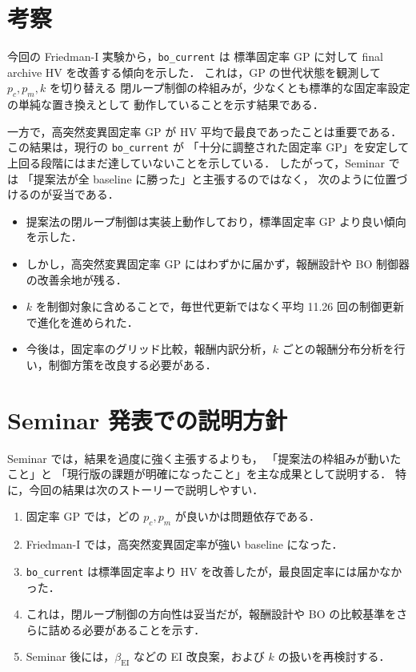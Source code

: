 \documentclass[a4paper,11pt]{ltjsarticle}
\begin{document}
\section{考察}

今回の Friedman-I 実験から，\texttt{bo\_current} は
標準固定率 GP に対して final archive HV を改善する傾向を示した．
これは，GP の世代状態を観測して \(p_c,p_m,k\) を切り替える
閉ループ制御の枠組みが，少なくとも標準的な固定率設定の単純な置き換えとして
動作していることを示す結果である．

一方で，高突然変異固定率 GP が HV 平均で最良であったことは重要である．
この結果は，現行の \texttt{bo\_current} が
「十分に調整された固定率 GP」を安定して上回る段階にはまだ達していないことを示している．
したがって，Seminar では
「提案法が全 baseline に勝った」と主張するのではなく，
次のように位置づけるのが妥当である．

\begin{itemize}
  \item 提案法の閉ループ制御は実装上動作しており，標準固定率 GP より良い傾向を示した．
  \item しかし，高突然変異固定率 GP にはわずかに届かず，報酬設計や BO 制御器の改善余地が残る．
  \item \(k\) を制御対象に含めることで，毎世代更新ではなく平均 11.26 回の制御更新で進化を進められた．
  \item 今後は，固定率のグリッド比較，報酬内訳分析，\(k\) ごとの報酬分布分析を行い，制御方策を改良する必要がある．
\end{itemize}

\section{Seminar 発表での説明方針}

Seminar では，結果を過度に強く主張するよりも，
「提案法の枠組みが動いたこと」と
「現行版の課題が明確になったこと」を主な成果として説明する．
特に，今回の結果は次のストーリーで説明しやすい．

\begin{enumerate}
  \item 固定率 GP では，どの \(p_c,p_m\) が良いかは問題依存である．
  \item Friedman-I では，高突然変異固定率が強い baseline になった．
  \item \texttt{bo\_current} は標準固定率より HV を改善したが，最良固定率には届かなかった．
  \item これは，閉ループ制御の方向性は妥当だが，報酬設計や BO の比較基準をさらに詰める必要があることを示す．
  \item Seminar 後には，\(\beta_{\mathrm{EI}}\) などの EI 改良案，および \(k\) の扱いを再検討する．
\end{enumerate}
\end{document}
